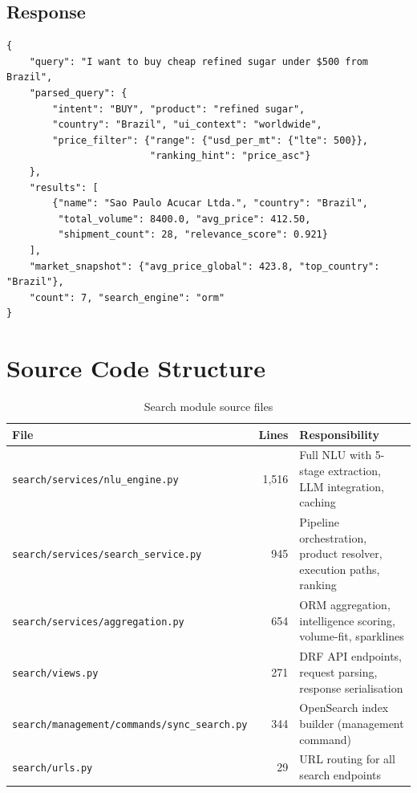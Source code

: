 \documentclass[12pt,a4paper]{article}
\begin{document}
\subsection{Response}

\begin{lstlisting}[caption={Abbreviated API response}]
{
    "query": "I want to buy cheap refined sugar under $500 from Brazil",
    "parsed_query": {
        "intent": "BUY", "product": "refined sugar",
        "country": "Brazil", "ui_context": "worldwide",
        "price_filter": {"range": {"usd_per_mt": {"lte": 500}},
                         "ranking_hint": "price_asc"}
    },
    "results": [
        {"name": "Sao Paulo Acucar Ltda.", "country": "Brazil",
         "total_volume": 8400.0, "avg_price": 412.50,
         "shipment_count": 28, "relevance_score": 0.921}
    ],
    "market_snapshot": {"avg_price_global": 423.8, "top_country": "Brazil"},
    "count": 7, "search_engine": "orm"
}
\end{lstlisting}

\newpage
\section{Source Code Structure}
\label{sec:code}

\begin{table}[H]
\centering
\renewcommand{\arraystretch}{1.3}
\begin{tabularx}{\textwidth}{lrX}
\toprule
\rowcolor{tableheader!20}
\textbf{File} & \textbf{Lines} & \textbf{Responsibility} \\
\midrule
\texttt{search/services/nlu\_engine.py}   & 1,516 &
  Full NLU with 5-stage extraction, LLM integration, caching \\
\texttt{search/services/search\_service.py} & 945 &
  Pipeline orchestration, product resolver, execution paths, ranking \\
\texttt{search/services/aggregation.py}   & 654 &
  ORM aggregation, intelligence scoring, volume-fit, sparklines \\
\texttt{search/views.py}                  & 271 &
  DRF API endpoints, request parsing, response serialisation \\
\texttt{search/management/commands/sync\_search.py} & 344 &
  OpenSearch index builder (management command) \\
\texttt{search/urls.py}                   & 29 &
  URL routing for all search endpoints \\
\bottomrule
\end{tabularx}
\caption{Search module source files}
\end{table}
\end{document}
